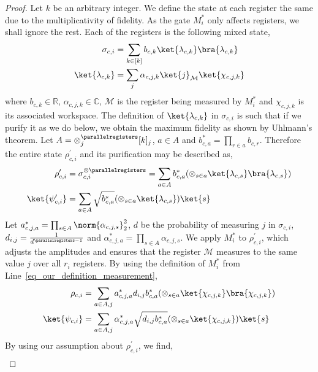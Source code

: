 \begin{proof}
    Let $k$ be an arbitrary integer. We define the state at each register the same due to the multiplicativity of fidelity.
    As the gate $M^*_i$ only affects \parallelregisters registers, we shall ignore the rest. Each of the \parallelregisters registers is the following mixed state,
    \begin{align*}
        \sigma_{c,i} &= \sum_{k\in [k]} b_{c,k} \ket{\lambda_{c,k}}\bra{\lambda_{c,k}}\\
        \ket{\lambda_{c,k}} &= \sum_j \alpha_{c,j, k} \ket{j}_{\mathcal{M}}\ket{\chi_{c,j,k}}
    \end{align*}
    where $b_{c,k}\in \mathbb{R}$, $\alpha_{c,j,k}\in \mathbb{C}$, $\mathcal{M}$ is the register being measured by $M_i^*$ and $\chi_{c,j,k}$ is its associated workspace.
    The definition of $\ket{\lambda_{c,k}}$ in $\sigma_{c,i}$ is such that if we purify it as we do below, we obtain the maximum fidelity as shown by Uhlmann's theorem.
    Let $A = \otimes_j^{\parallelregisters} [k]_j$, $a\in A$ and $b^*_{c,a} = \prod_{r\in a} b_{c,r}$.
    Therefore the entire state $\rho^\prime_{c, i}$ and its purification may be described as,
    \begin{align*}
        \rho^\prime_{c, i} &= \sigma_{c,i}^{\otimes \parallelregisters} = \sum_{a\in A} b^*_{c,a} (\otimes_{s\in a} \ket{\lambda_{c,s}}\bra{\lambda_{c,s}}) \\
        \ket{\psi^\prime_{c,i}} &= \sum_{a\in A} \sqrt{b^*_{c,a}} (\otimes_{s\in a} \ket{\lambda_{c,s}})\ket{s}
    \end{align*}
    Let $a^*_{c,j,a} = \prod_{s\in A} \norm{\alpha_{c, j, s}}_2^2$, $d$ be the probability of measuring $j$ in $\sigma_{c,i}$, $d_{i,j}=\frac{1}{d^{\parallelregisters - 1}}$ and $\alpha^*_{c,j,a} = \prod_{s\in A} \alpha_{c,j,s}$.
    We apply $M^*_i$ to $\rho^\prime_{c, i}$, which adjusts the amplitudes and ensures that the register $\mathcal{M}$ measures to the same value $j$ over all $r_i$ registers. By using the definition of $M^*_i$ from Line~\ref{eq_our_definition_measurement},
    \begin{align*}
        \rho_{c,i} &= \sum_{a\in A, j} a^*_{c,j,a} d_{i,j} b^*_{c,a} (\otimes_{s\in a} \ket{\chi_{c,j,k}}\bra{\chi_{c,j,k}}) \\
        \ket{\psi_{c,i}} &= \sum_{a\in A, j} \alpha^*_{c,j,a} \sqrt{d_{i,j}b^*_{c,a}} (\otimes_{s\in a} \ket{\chi_{c,j,k}})\ket{s}
    \end{align*}
    By using our assumption about $\rho^\prime_{c, i}$, we find,
    \begin{align}

\end{align}
\end{proof}

